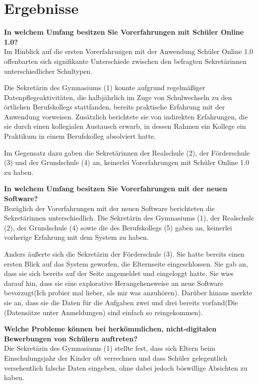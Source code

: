 \pagebreak
\section{Ergebnisse}

\textbf{In welchem Umfang besitzen Sie Vorerfahrungen mit Schüler Online 1.0?}\\
Im Hinblick auf die ersten Vorerfahrungen mit der Anwendung Schüler Online 1.0 offenbarten sich signifikante Unterschiede zwischen den befragten Sekretärinnen unterschiedlicher Schultypen.

Die Sekretärin des Gymnasiums (1) konnte aufgrund regelmäßiger Datenpflegeaktivitäten, die halbjährlich im Zuge von Schulwechseln zu den örtlichen Berufskollegs stattfanden, bereits praktische Erfahrung mit der Anwendung vorweisen. Zusätzlich berichtete sie von indirekten Erfahrungen, die sie durch einen kollegialen Austausch erwarb, in dessen Rahmen ein Kollege ein Praktikum in einem Berufskolleg absolviert hatte.

Im Gegensatz dazu gaben die Sekretärinnen der Realschule (2), der Förderschule (3) und der Grundschule (4) an, keinerlei Vorerfahrungen mit Schüler Online 1.0 zu haben.


\textbf{In welchem Umfang besitzen Sie Vorerfahrungen mit der neuen Software?}\\
Bezüglich der Vorerfahrungen mit der neuen Software berichteten die Sekretärinnen unterschiedlich. Die Sekretärin des Gymnasiums (1), der Realschule (2), der Grundschule (4) sowie die des Berufskollegs (5) gaben an, keinerlei vorherige Erfahrung mit dem System zu haben.

Anders äußerte sich die Sekretärin der Förderschule (3). Sie hatte bereits einen ersten Blick auf das System geworfen, die Elternseite eingeschlossen. Sie gab an, dass sie sich bereits auf der Seite angemeldet und eingeloggt hatte. Sie wies darauf hin, dass sie eine explorative Herangehensweise an neue Software bevorzugt(\glqq Ich probier mal lieber, als mir was anzuhören\grqq{}). Darüber hinaus merkte sie an, dass sie die Daten für die Aufgaben zwei und drei bereits vorfand(\glqq Die (Datensätze unter Anmeldungen) sind einfach so reingekommen\grqq{}).

\textbf{Welche Probleme können bei herkömmlichen, nicht-digitalen Bewerbungen von Schülern auftreten?}\\
Die Sekretärin des Gymnasiums (1) stellte fest, dass sich Eltern beim Einschulungsjahr der Kinder oft verrechnen und dass Schüler gelegentlich versehentlich falsche Daten eingeben, ohne dabei jedoch böswillige Absichten zu haben.

